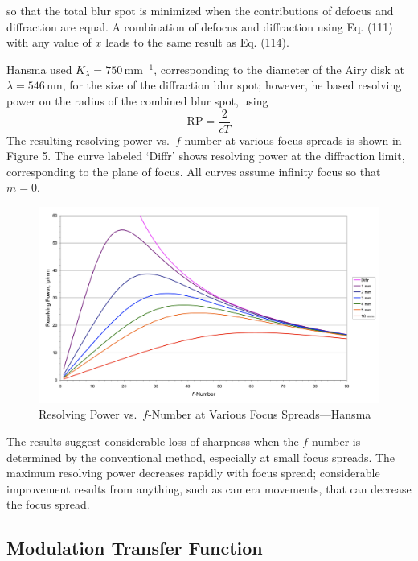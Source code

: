 \documentclass[11pt, oneside]{scrartcl}   	%
\begin{document}
so that the total blur spot is minimized when the contributions of defocus and diffraction are equal. A combination of defocus and diffraction using Eq. (111) with any value of $x$ leads to the same result as Eq. (114).

Hansma used $K_λ = 750\,\mathrm{mm}^{-1}$, corresponding to the diameter of the Airy disk at
$λ = 546\,\mathrm{nm}$, for the size of the diffraction blur spot; however, he based resolving power on the radius of the combined blur spot, using
\begin{equation}
\mathrm{RP}= \frac2 {cT}
\end{equation}
The resulting resolving power vs.\ $f$-number at various focus spreads is shown in Figure 5. The curve labeled ‘\textsf{Diffr}’ shows resolving power at the diffraction limit, corresponding to the plane of focus. All curves assume infinity focus so that $m = 0$.
\begin{figure}[htbp] %
   \centering
   \includegraphics[width=\linewidth]{figure/fig_dofd_5} 
   \caption{Resolving Power vs.\ $f$-Number at Various Focus Spreads---Hansma}
   \label{fig:respow}
\end{figure}
The results suggest considerable loss of sharpness when the $f$-number is determined by the conventional method, especially at small focus spreads. The maximum resolving power decreases rapidly with focus spread; considerable improvement results from anything, such as camera movements, that can decrease the focus spread.
\subsection{Modulation Transfer Function}
\end{document}
